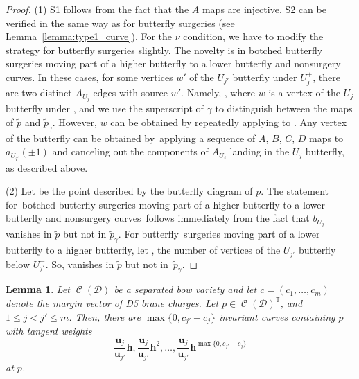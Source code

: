 \documentclass[11pt]{article}
\numberwithin{equation}{section}
\newtheorem{Lemma}[Theorem]{Lemma}
\newcommand{\brane}{\mathcal D}
\newcommand{\torus}{\mathbb T}
\newcommand{\MM}{\mathbb M}
\newcommand{\hb}{\mathbf h}
\newcommand{\ub}{\mathbf u}
\newcommand{\prequot}{\widetilde \MM^s}
\DeclareMathOperator{\bowvar}{\mathcal C}
\begin{document}
\begin{proof}
(1) S1 follows from the fact that the $A$ maps are injective. S2 can be verified in the same way as for butterfly surgeries (see Lemma~\ref{lemma:type1_curve}). For the $\nu$ condition, we have to modify the strategy for butterfly surgeries slightly. The novelty is in botched butterfly surgeries moving part of a higher butterfly to a lower butterfly and nonsurgery curves. In these cases, for some vertices $w'$ of the $U_{j'}$ butterfly under $U_j^+$, there are two distinct $A_{U_j}$ edges with source $w'$. Namely, , where $w$ is a vertex of the $U_j$ butterfly under , and we use the superscript of $\gamma$ to distinguish between the maps of $\tilde{p}$ and $\tilde{p}_\gamma$. However, $w$ can be obtained by repeatedly applying  to . Any vertex of the  butterfly can be obtained by~applying a sequence of $A$, $B$, $C$, $D$ maps to $a_{U_{j'}}(\pm 1)$ and canceling out the components of $A_{U_j}$ landing in the $U_j$ butterfly, as described above.

(2) Let \smash{$\tilde{p} \in \prequot$} be the point described by the butterfly diagram of $p$. The statement for~bot\-ched butterfly surgeries moving part of a higher butterfly to a lower butterfly and non\-sur\-gery curves~follows immediately from the fact that $b_{U_j}$ vanishes in $\tilde{p}$ but not in $\tilde{p}_\gamma$. For \linebreak butterfly~surgeries moving part of a lower butterfly to a higher butterfly, let
,
the number of vertices of the $U_{j'}$ butterfly below $U_{j'}^-$. So,  vanishes in $\tilde{p}$ but not in~$\tilde{p}_\gamma$.
\end{proof}

\begin{Lemma} \label{lemma:nonsurgery}
Let $\bowvar(\brane)$ be a separated bow variety and let $c = (c_1, \dots , c_m)$ denote the margin vector of D5 brane charges. Let $p\in \bowvar(\brane)^\torus$, and $1\leq j < j' \leq m$. Then, there are $\max\{0, c_{j'} - c_j\}$ invariant curves containing $p$ with tangent weights
\[
\frac{\ub_j}{\ub_{j'}}\hb, \frac{\ub_j}{\ub_{j'}}\hb^2, \dots , \frac{\ub_j}{\ub_{j'}}\hb^{\max\{0, c_{j'} - c_j\}}
\]
at $p$.
\end{Lemma}
\end{document}
